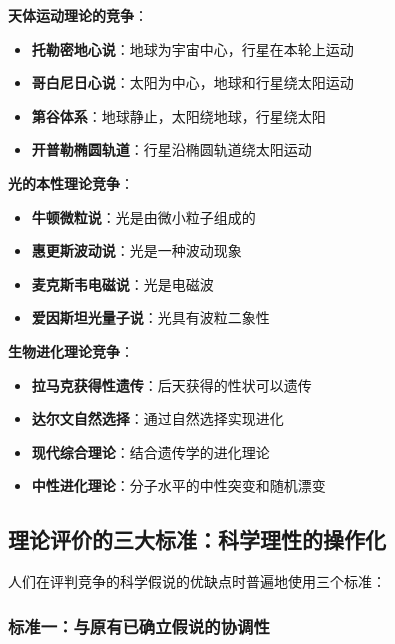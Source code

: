 \begin{examplebox}[title=科学史上的重大理论竞争]
\textbf{天体运动理论的竞争}：
\begin{itemize}
\item \textbf{托勒密地心说}：地球为宇宙中心，行星在本轮上运动
\item \textbf{哥白尼日心说}：太阳为中心，地球和行星绕太阳运动
\item \textbf{第谷体系}：地球静止，太阳绕地球，行星绕太阳
\item \textbf{开普勒椭圆轨道}：行星沿椭圆轨道绕太阳运动
\end{itemize}

\textbf{光的本性理论竞争}：
\begin{itemize}
\item \textbf{牛顿微粒说}：光是由微小粒子组成的
\item \textbf{惠更斯波动说}：光是一种波动现象
\item \textbf{麦克斯韦电磁说}：光是电磁波
\item \textbf{爱因斯坦光量子说}：光具有波粒二象性
\end{itemize}

\textbf{生物进化理论竞争}：
\begin{itemize}
\item \textbf{拉马克获得性遗传}：后天获得的性状可以遗传
\item \textbf{达尔文自然选择}：通过自然选择实现进化
\item \textbf{现代综合理论}：结合遗传学的进化理论
\item \textbf{中性进化理论}：分子水平的中性突变和随机漂变
\end{itemize}
\end{examplebox}

\subsection{理论评价的三大标准：科学理性的操作化}

人们在评判竞争的科学假说的优缺点时普遍地使用三个标准：

\subsubsection{标准一：与原有已确立假说的协调性}

